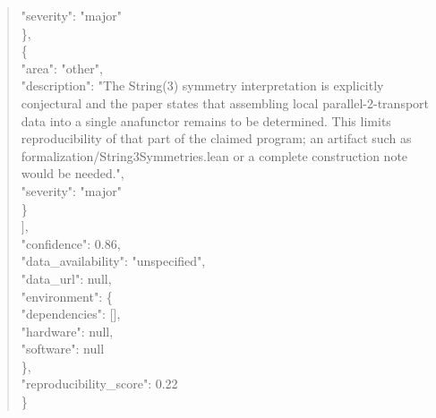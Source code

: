 \documentclass[11pt]{article}
\begin{document}
\begin{quote}
      "severity": "major"\\
    \},\\
    \{\\
      "area": "other",\\
      "description": "The String(3) symmetry interpretation is explicitly conjectural and the paper states that assembling local parallel-2-transport data into a single anafunctor remains to be determined. This limits reproducibility of that part of the claimed program; an artifact such as formalization/String3Symmetries.lean or a complete construction note would be needed.",\\
      "severity": "major"\\
    \}\\
  ],\\
  "confidence": 0.86,\\
  "data\_availability": "unspecified",\\
  "data\_url": null,\\
  "environment": \{\\
    "dependencies": [],\\
    "hardware": null,\\
    "software": null\\
  \},\\
  "reproducibility\_score": 0.22\\
\}\\
\end{quote}
\end{document}
